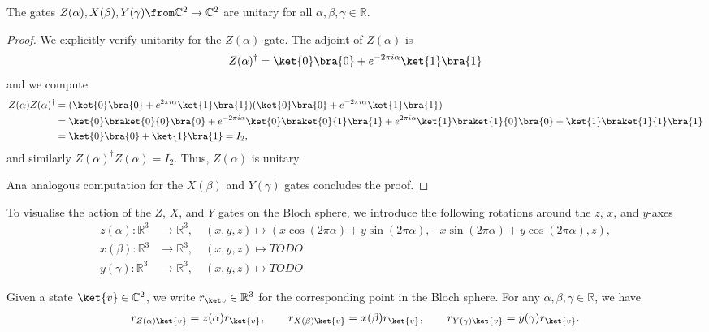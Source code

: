 \documentclass[a4paper,oneside, 12pt]{amsart}
\begin{document}
\begin{lemma}\label{lem:xyz-gates-are-unitary}
  The gates \(Z(\alpha), X(\beta), Y(\gamma) \from \mathbb{C}^{2} \to \mathbb{C}^{2}\) are unitary for all \(\alpha,\beta, \gamma \in \mathbb{R}\).
\end{lemma}
\begin{proof}
  We explicitly verify unitarity for the \( Z(\alpha) \) gate.
  The adjoint of \( Z(\alpha) \) is
  \begin{equation*}
    Z(\alpha)^\dagger = \ket{0}\bra{0} + e^{-2\pi i \alpha}\ket{1}\bra{1}
  \end{equation*}
  and we compute
  \begin{align*}
    Z(\alpha) Z(\alpha)^\dagger
    & = (\ket{0}\bra{0} + e^{2\pi i \alpha}\ket{1}\bra{1})(\ket{0}\bra{0} + e^{-2\pi i \alpha}\ket{1}\bra{1})\\
    & = \ket{0} \braket{0}{0} \bra{0}
    + e^{-2\pi i \alpha}\ket{0}\braket{0}{1}\bra{1}
    + e^{2\pi i \alpha}\ket{1}\braket{1}{0}\bra{0}
      + \ket{1}\braket{1}{1}\bra{1}\\
    & = \ket{0}\bra{0} + \ket{1}\bra{1} = I_2,
  \end{align*}
  and similarly \( Z(\alpha)^\dagger Z(\alpha) = I_2 \).
  Thus, \( Z(\alpha) \) is unitary.

  Ana analogous computation for the \(X(\beta)\) and \(Y(\gamma)\) gates concludes the proof.
\end{proof}

To visualise the action of the \( Z \), \( X \), and \( Y \) gates on the Bloch sphere,
we introduce the following rotations around the \( z \), \( x \), and \( y \)-axes
\begin{subequations}
  \begin{align}
    z(\alpha) \colon \mathbb{R}^3 &\to \mathbb{R}^3, \quad (x, y, z) \mapsto (x \cos(2\pi \alpha) + y \sin(2\pi \alpha), - x \sin(2\pi \alpha) + y \cos(2\pi \alpha), z), \\
    x(\beta) \colon \mathbb{R}^3 &\to \mathbb{R}^3, \quad (x, y, z) \mapsto TODO\\
    y(\gamma) \colon \mathbb{R}^3 &\to \mathbb{R}^3, \quad (x, y, z) \mapsto TODO
  \end{align}
\end{subequations}

\begin{lemma}\label{lem:xyz-gates-are-rotations}
  Given a state \(\ket{v} \in \mathbb{C}^{2}\), we write \(r_{\ket v} \in \mathbb{R}^{3}\) for the corresponding point in the Bloch sphere.
  For any \( \alpha, \beta, \gamma \in \mathbb{R} \), we have
  \begin{align*}
    r_{Z(\alpha) \ket{v}} = z(\alpha)r_{\ket{v}}, \qquad
    r_{X(\beta) \ket{v}} = x(\beta)r_{\ket{v}}, \qquad
    r_{Y(\gamma) \ket{v}} = y(\gamma)r_{\ket{v}}.
  \end{align*}
\end{lemma}
\end{document}
